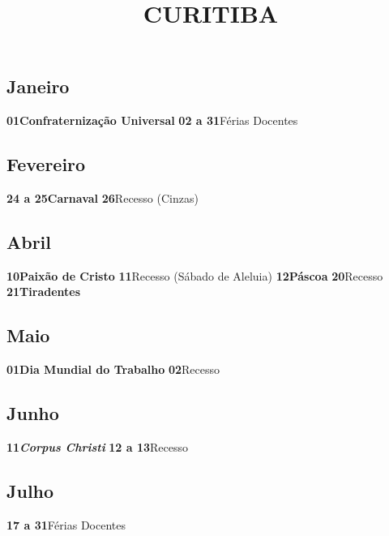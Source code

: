 \documentclass[thesis]{hmcposter}
\author{ }
\title{CURITIBA}
\begin{document}
\begin{poster}
\normalsize\subsection{Janeiro}\textbf{01}\quad \quad \quad \quad \textbf{Confraternização Universal} \newline\textbf{02 a 31}\quad \quad Férias Docentes \subsection{Fevereiro}\textbf{24 a 25}\quad \quad \textbf{Carnaval} \newline\textbf{26}\quad \quad \quad \quad Recesso (Cinzas) \subsection{Abril}\textbf{10}\quad \quad \quad \quad \textbf{Paixão de Cristo} \newline\textbf{11}\quad \quad \quad \quad Recesso (Sábado de Aleluia) \newline\textbf{12}\quad \quad \quad \quad \textbf{Páscoa} \newline\textbf{20}\quad \quad \quad \quad Recesso \newline\textbf{21}\quad \quad \quad \quad \textbf{Tiradentes} \subsection{Maio}\textbf{01}\quad \quad \quad \quad \textbf{Dia Mundial do Trabalho} \newline\textbf{02}\quad \quad \quad \quad Recesso \subsection{Junho}\textbf{11}\quad \quad \quad \quad \textbf{\textit{Corpus Christi}} \newline\textbf{12 a 13}\quad \quad Recesso \subsection{Julho}\textbf{17 a 31}\quad \quad Férias Docentes 
\end{poster}
\end{document}
